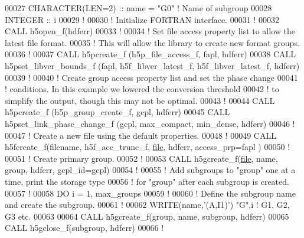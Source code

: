 \begin{DoxyCode}
00027   \textcolor{keywordtype}{CHARACTER(LEN=2)} :: name = \textcolor{stringliteral}{"G0"} \textcolor{comment}{! Name of subgroup}
00028   \textcolor{keywordtype}{INTEGER} :: i
00029   \textcolor{comment}{!}
00030   \textcolor{comment}{! Initialize FORTRAN interface.}
00031   \textcolor{comment}{!}
00032   \textcolor{keyword}{CALL }h5open\_f(hdferr)
00033   \textcolor{comment}{!}
00034   \textcolor{comment}{! Set file access property list to allow the latest file format.}
00035   \textcolor{comment}{! This will allow the library to create new format groups.}
00036   \textcolor{comment}{!}
00037   \textcolor{keyword}{CALL }h5pcreate\_f (h5p\_file\_access\_f, fapl, hdferr)
00038   \textcolor{keyword}{CALL }h5pset\_libver\_bounds\_f (fapl, h5f\_libver\_latest\_f, h5f\_libver\_latest\_f, hdferr)
00039   \textcolor{comment}{!}
00040   \textcolor{comment}{! Create group access property list and set the phase change}
00041   \textcolor{comment}{! conditions.  In this example we lowered the conversion threshold}
00042   \textcolor{comment}{! to simplify the output, though this may not be optimal.}
00043   \textcolor{comment}{!}
00044   \textcolor{keyword}{CALL }h5pcreate\_f (h5p\_group\_create\_f, gcpl, hdferr)
00045   \textcolor{keyword}{CALL }h5pset\_link\_phase\_change\_f (gcpl, max\_compact, min\_dense, hdferr)
00046   \textcolor{comment}{!}
00047   \textcolor{comment}{! Create a new file using the default properties.}
00048   \textcolor{comment}{!}
00049   \textcolor{keyword}{CALL }h5fcreate\_f(filename, h5f\_acc\_trunc\_f, \hyperlink{structfile}{file}, hdferr, access\_prp=fapl )
00050   \textcolor{comment}{!}
00051   \textcolor{comment}{! Create primary group.}
00052   \textcolor{comment}{!}
00053   \textcolor{keyword}{CALL }h5gcreate\_f(\hyperlink{structfile}{file}, name, group, hdferr, gcpl\_id=gcpl)
00054   \textcolor{comment}{!}
00055   \textcolor{comment}{! Add subgroups to "group" one at a time, print the storage type}
00056   \textcolor{comment}{! for "group" after each subgroup is created.}
00057   \textcolor{comment}{!}
00058   \textcolor{keywordflow}{DO} i = 1, max\_groups
00059      \textcolor{comment}{!}
00060      \textcolor{comment}{! Define the subgroup name and create the subgroup.}
00061      \textcolor{comment}{!}
00062      \textcolor{keyword}{WRITE}(name,\textcolor{stringliteral}{'(A,I1)'}) \textcolor{stringliteral}{"G"},i \textcolor{comment}{! G1, G2, G3 etc.}
00063 
00064      \textcolor{keyword}{CALL }h5gcreate\_f(group, name, subgroup, hdferr)
00065      \textcolor{keyword}{CALL }h5gclose\_f(subgroup, hdferr)
00066      \textcolor{comment}{!}

\end{DoxyCode}
